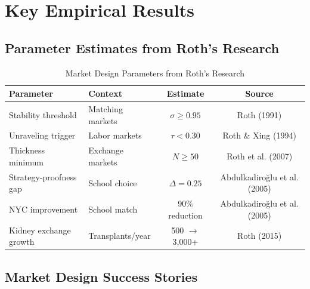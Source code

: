 \section{Key Empirical Results}

\subsection{Parameter Estimates from Roth's Research}

\begin{table}[h]
\centering
\caption{Market Design Parameters from Roth's Research}
\label{tab:roth-parameters}
\begin{tabular}{llcc}
\toprule
\textbf{Parameter} & \textbf{Context} & \textbf{Estimate} & \textbf{Source} \\
\midrule
Stability threshold & Matching markets & $\sigma \geq 0.95$ & Roth (1991) \\
Unraveling trigger & Labor markets & $\tau < 0.30$ & Roth \& Xing (1994) \\
Thickness minimum & Exchange markets & $N \geq 50$ & Roth et al. (2007) \\
Strategy-proofness gap & School choice & $\Delta = 0.25$ & Abdulkadiroğlu et al. (2005) \\
NYC improvement & School match & 90\% reduction & Abdulkadiroğlu et al. (2005) \\
Kidney exchange growth & Transplants/year & 500 $\rightarrow$ 3,000+ & Roth (2015) \\
\bottomrule
\end{tabular}
\end{table}

\subsection{Market Design Success Stories}

